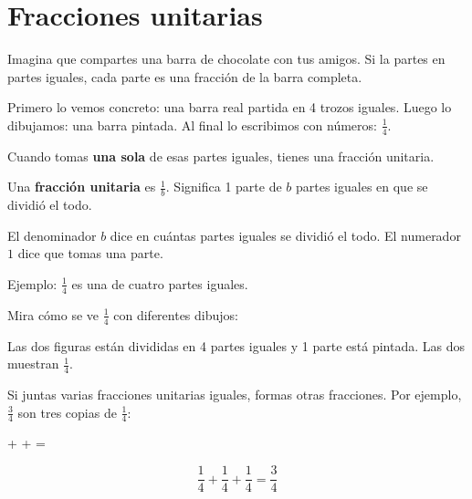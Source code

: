 
\section{Fracciones unitarias}

Imagina que compartes una barra de chocolate con tus amigos. Si la partes en partes iguales, cada parte es una fracción de la barra completa.

Primero lo vemos concreto: una barra real partida en 4 trozos iguales. Luego lo dibujamos: una barra pintada. Al final lo escribimos con números: $\frac{1}{4}$.

Cuando tomas \textbf{una sola} de esas partes iguales, tienes una fracción unitaria.

\begin{wbidea}
Una \textbf{fracción unitaria} es $\frac{1}{b}$. Significa 1 parte de $b$ partes iguales en que se dividió el todo.

El denominador $b$ dice en cuántas partes iguales se dividió el todo. El numerador $1$ dice que tomas una parte.

Ejemplo: $\frac{1}{4}$ es una de cuatro partes iguales.
\end{wbidea}

Mira cómo se ve $\frac{1}{4}$ con diferentes dibujos:

\begin{center}
 \hspace{1cm} 
\end{center}

Las dos figuras están divididas en 4 partes iguales y 1 parte está pintada. Las dos muestran $\frac{1}{4}$.

Si juntas varias fracciones unitarias iguales, formas otras fracciones. Por ejemplo, $\frac{3}{4}$ son tres copias de $\frac{1}{4}$:

\begin{center}
 \hspace{0.3cm} + \hspace{0.3cm}  \hspace{0.3cm} + \hspace{0.3cm}  \hspace{0.3cm} = \hspace{0.3cm} 
\end{center}
\[ \frac{1}{4} + \frac{1}{4} + \frac{1}{4} = \frac{3}{4} \]

